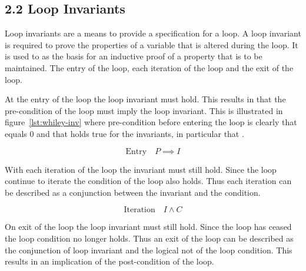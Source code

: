 






\subsection*{2.2 Loop Invariants}
%

Loop invariants are a means to provide a specification for a loop.
A loop invariant is required to prove the properties of a variable
that is altered during the loop.
It is used to as the basis for an inductive proof of a
property that is to be maintained.
The entry of the loop, each iteration of the loop and the exit of the
loop.

At the entry of the loop the loop invariant must hold.
This results in that the pre-condition of the loop must imply
the loop invariant.
This is illustrated in figure~\ref{lst:whiley-inv} where pre-condition
before entering the loop is clearly that  equals 0 and that holds
true for the invariants, in particular that .

$$\text{Entry} \quad P \implies I$$

With each iteration of the loop the invariant must still hold.
Since the loop continue to iterate the condition of the loop
also holds. Thus each iteration can be described as a conjunction
between the invariant and the condition.

$$\text{Iteration} \quad I \wedge C $$

On exit of the loop the loop invariant must still hold.
Since the loop has ceased the loop condition no longer
holds. Thus an exit of the loop can be described
as the conjunction of loop invariant and the logical
not of the loop condition.
This results in an implication of the post-condition of the
loop.

